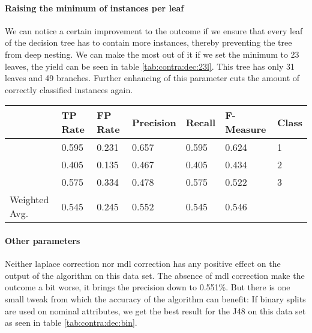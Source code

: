 \documentclass[paper=a4, fontsize=11pt]{scrartcl} %
\numberwithin{equation}{section} %
\numberwithin{figure}{section} %
\numberwithin{table}{section} %
\begin{document}
\paragraph{Raising the minimum of instances per leaf}
We can notice a certain improvement to the outcome if we ensure that every leaf of the decision tree has to contain more instances, thereby preventing the tree from deep nesting. We can make the most out of it if we set the minimum to 23 leaves, the yield can be seen in table \ref{tab:contra:dec:23l}. This tree has only 31 leaves and 49 branches. Further enhancing of this parameter cuts the amount of correctly classified instances again.


\begin{table*}[htb]\centering
  \begin{tabular*}{\columnwidth}{@{}lllllll@{}}
      \toprule 
              &   TP Rate & FP Rate & Precision & Recall & F-Measure &  Class \\ \midrule      
              &   0.595   & 0.231   & 0.657     & 0.595  & 0.624     &  1     \\      
              &   0.405   & 0.135   & 0.467     & 0.405  & 0.434     &  2     \\      
              &   0.575   & 0.334   & 0.478     & 0.575  & 0.522     &  3     \\      
Weighted Avg. &   0.545   & 0.245   & 0.552     & 0.545  & 0.546     &        \\ \bottomrule     
    \end{tabular*}
\caption{Decision Tree on Contraceptive Data Set -- at least 23 instances per leaf} 
\label{tab:contra:dec:23l}
\end{table*}
\FloatBarrier
\paragraph{Other parameters}
Neither laplace correction nor mdl correction has any positive effect on the output of the algorithm on this data set. The absence of mdl correction make the outcome a bit worse, it brings the precision down to 0.551\%.  But there is one small tweak from which the accuracy of the algorithm can benefit: If binary splits are used on nominal attributes, we get the best result for the J48 on this data set as seen in table \ref{tab:contra:dec:bin}.
\end{document}
